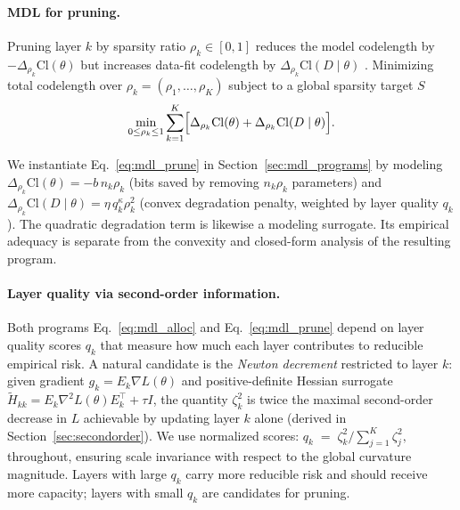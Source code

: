 \documentclass[accepted]{uai2026}%
\theoremstyle{remark}%
\begin{document}
\paragraph{MDL for pruning.}
Pruning layer $k$ by sparsity ratio $\rho_k \in [0,1]$ reduces the model
codelength by $-\Delta_{\rho_{k}}\mathrm{Cl}(\theta)$ but increases data-fit
codelength by $\Delta_{\rho_{k}}\mathrm{Cl}(D\mid\theta)$ \citep{lotteryTicketHypothesis}.
Minimizing total codelength over $\rho_k = (\rho_1,\ldots,\rho_K)$
subject to a global sparsity target $S$%
\begin{equation}
  \label{eq:mdl_prune}
      \min_{0 \le \rho_k \le 1}
  \sum_{k=1}^{K}
  \Bigl[
    \Delta_{\rho_k}\mathrm{Cl}(\theta)
    +
    \Delta_{\rho_k}\mathrm{Cl}(D \mid \theta)
  \Bigr].
\end{equation}

We instantiate Eq.~\eqref{eq:mdl_prune} in Section~\ref{sec:mdl_programs}
by modeling $\Delta_{\rho_k}\mathrm{Cl}(\theta) = -b\,n_k\rho_k$
(bits saved by removing $n_k\rho_k$ parameters) and
$\Delta_{\rho_k}\mathrm{Cl}(D\mid\theta) = \eta\,q_k^\kappa\rho_k^2$
(convex degradation penalty, weighted by layer quality $q_k$).
The quadratic degradation term is likewise a modeling surrogate. Its empirical adequacy is separate from the convexity and closed-form analysis of the resulting program.


\paragraph{Layer quality via second-order information.} Both programs Eq.~\eqref{eq:mdl_alloc} and Eq.~\eqref{eq:mdl_prune} depend on
layer quality scores $q_k$ that measure how much each layer contributes
to reducible empirical risk.
A natural candidate is the \emph{Newton decrement} restricted to layer
$k$: given gradient $g_k = E_k\nabla L(\theta)$ and positive-definite
Hessian surrogate $\widetilde{H}_{kk} = E_k\nabla^2 L(\theta)E_k^\top + \tau I$,
the quantity $\zeta_k^{2}$
is twice the maximal second-order decrease in $L$ achievable by
updating layer $k$ alone (derived in Section~\ref{sec:secondorder}).
We use normalized scores:
\(
  q_k
  \;=\;
  \zeta_k^{2}\bigg/\sum_{j=1}^{K}\zeta_j^{2},
\)
throughout, ensuring scale invariance with respect to the global
curvature magnitude.
Layers with large $q_k$ carry more reducible risk and should receive
more capacity; layers with small $q_k$ are candidates for pruning.
\end{document}
